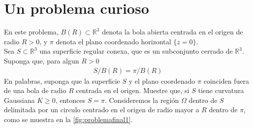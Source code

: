 \documentclass[oneside,11pt]{memoir}
\begin{document}
\section{Un problema curioso}
En este problema, $B(R) \subset \mathbb{R}^3$ denota la bola abierta centrada en el origen de radio $R>0$, y $\pi$ denota el plano coordenado horizontal $\{z=0\}$.\\

Sea $S \subset \mathbb{R}^3$ una superficie regular conexa, que es un subconjunto cerrado de $\mathbb{R}^3$. Suponga que, para algun $R > 0$
\begin{align*}
    S/B(R)=\pi/B(R)
\end{align*}
En palabras, suponga que la superficie $S$ y el plano coordenado $\pi$ coinciden fuera de una bola de radio $R$ centrada en el origen. Muestre que, si $S$ tiene curvatura Gaussiana $K \geq 0$, entonces $S = \pi$.
 Consideremos la región $\Omega$ dentro de $S$ delimitada por un circulo centrado en el origen de radio mayor a $R$ dentro de $\pi$, como se muestra en la \ref{fig:problemafinal1}.
\end{document}
